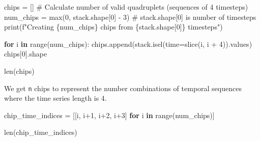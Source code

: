 \documentclass[
  letterpaper,
  DIV=11,
  numbers=noendperiod]{scrreprt}
\newenvironment{Shaded}{\begin{snugshade}}{\end{snugshade}}
\newcommand{\BuiltInTok}[1]{\textcolor[rgb]{0.00,0.23,0.31}{#1}}
\newcommand{\CommentTok}[1]{\textcolor[rgb]{0.37,0.37,0.37}{#1}}
\newcommand{\ControlFlowTok}[1]{\textcolor[rgb]{0.00,0.23,0.31}{\textbf{#1}}}
\newcommand{\DecValTok}[1]{\textcolor[rgb]{0.68,0.00,0.00}{#1}}
\newcommand{\KeywordTok}[1]{\textcolor[rgb]{0.00,0.23,0.31}{\textbf{#1}}}
\newcommand{\NormalTok}[1]{\textcolor[rgb]{0.00,0.23,0.31}{#1}}
\newcommand{\OperatorTok}[1]{\textcolor[rgb]{0.37,0.37,0.37}{#1}}
\newcommand{\SpecialCharTok}[1]{\textcolor[rgb]{0.37,0.37,0.37}{#1}}
\newcommand{\SpecialStringTok}[1]{\textcolor[rgb]{0.13,0.47,0.30}{#1}}
\begin{document}
\begin{Shaded}
\begin{Highlighting}[]
\NormalTok{chips }\OperatorTok{=}\NormalTok{ []}
\CommentTok{\# Calculate number of valid quadruplets (sequences of 4 timesteps)}
\NormalTok{num\_chips }\OperatorTok{=} \BuiltInTok{max}\NormalTok{(}\DecValTok{0}\NormalTok{, stack.shape[}\DecValTok{0}\NormalTok{] }\OperatorTok{{-}} \DecValTok{3}\NormalTok{)  }\CommentTok{\# stack.shape[0] is number of timesteps}
\BuiltInTok{print}\NormalTok{(}\SpecialStringTok{f"Creating }\SpecialCharTok{\{}\NormalTok{num\_chips}\SpecialCharTok{\}}\SpecialStringTok{ chips from }\SpecialCharTok{\{}\NormalTok{stack}\SpecialCharTok{.}\NormalTok{shape[}\DecValTok{0}\NormalTok{]}\SpecialCharTok{\}}\SpecialStringTok{ timesteps"}\NormalTok{)}

\ControlFlowTok{for}\NormalTok{ i }\KeywordTok{in} \BuiltInTok{range}\NormalTok{(num\_chips):}
\NormalTok{    chips.append(stack.isel(time}\OperatorTok{=}\BuiltInTok{slice}\NormalTok{(i, i }\OperatorTok{+} \DecValTok{4}\NormalTok{)).values)}
\NormalTok{chips[}\DecValTok{0}\NormalTok{].shape}
\end{Highlighting}
\end{Shaded}

\begin{Shaded}
\begin{Highlighting}[]
\BuiltInTok{len}\NormalTok{(chips)}
\end{Highlighting}
\end{Shaded}

We get \texttt{n} chips to represent the number combinations of temporal
sequences where the time series length is 4.

\begin{Shaded}
\begin{Highlighting}[]
\NormalTok{chip\_time\_indices }\OperatorTok{=}\NormalTok{ [[i, i}\OperatorTok{+}\DecValTok{1}\NormalTok{, i}\OperatorTok{+}\DecValTok{2}\NormalTok{, i}\OperatorTok{+}\DecValTok{3}\NormalTok{] }\ControlFlowTok{for}\NormalTok{ i }\KeywordTok{in} \BuiltInTok{range}\NormalTok{(num\_chips)]}
\end{Highlighting}
\end{Shaded}

\begin{Shaded}
\begin{Highlighting}[]
\BuiltInTok{len}\NormalTok{(chip\_time\_indices)}
\end{Highlighting}
\end{Shaded}
\end{document}
